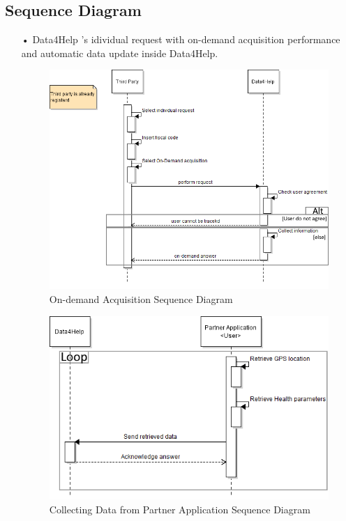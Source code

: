 \subsection{Sequence Diagram}
\begin{enumerate}
\item[•]{\Large Data4Help} 's idividual request with on-demand acquisition performance and automatic data update inside Data4Help.
\begin{figure}[H]
\centering
\includegraphics[scale=0.75]{Images/Seq_Data4Help_onDem.png}
\caption{On-demand Acquisition Sequence Diagram}
\end{figure}

\begin{figure}[H]
\centering
\includegraphics[scale=0.75]{Images/Seq_Data4Help_autoUp.png}
\caption{Collecting Data from Partner Application Sequence Diagram}
\end{figure}


\end{enumerate}
